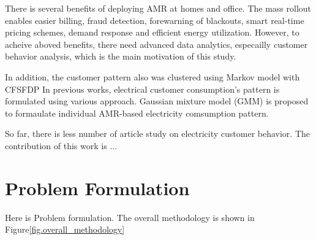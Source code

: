 \documentclass[conference]{IEEEtran}
\begin{document}
There is several benefits of deploying AMR at homes and office. The mass rollout enables easier billing, fraud detection, forewarning of blackouts, smart real-time pricing schemes, demand response and efficient energy utilization.
However, to acheive aboved benefits, there need advanced data analytics, especailly customer behavior analysis, which is the main motivation of this study.

In addition, the customer pattern also was clustered using Markov model with CFSFDP\cite{b5}
In previous works, electrical customer consumption's pattern is formulated using various approach. Gaussian mixture model (GMM) is proposed to formaulate individual AMR-based electricity comsumption pattern\cite{b3}.

So far, there is less number of article study on electricity customer behavior.
The contribution of this work is ...


\section{Problem Formulation}
Here is Problem formulation.
The overall methodology is shown in Figure\ref{fig.overall_methodology}
\end{document}
